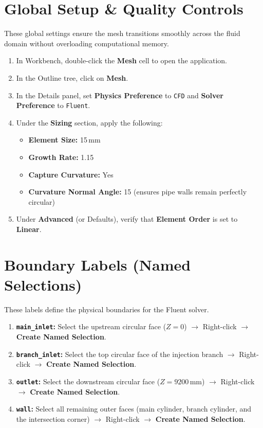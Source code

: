 \documentclass[12pt,a4paper]{report}
\begin{document}
\section{Global Setup \& Quality Controls}

These global settings ensure the mesh transitions smoothly across the fluid domain without overloading computational memory.

\begin{enumerate}
  \item In Workbench, double-click the \textbf{Mesh} cell to open the application.
  \item In the Outline tree, click on \textbf{Mesh}.
  \item In the Details panel, set \textbf{Physics Preference} to \texttt{CFD} and \textbf{Solver Preference} to \texttt{Fluent}.
  \item Under the \textbf{Sizing} section, apply the following:
  \begin{itemize}
    \item \textbf{Element Size:} 15\,mm
    \item \textbf{Growth Rate:} 1.15
    \item \textbf{Capture Curvature:} Yes
    \item \textbf{Curvature Normal Angle:} 15\textdegree{} (ensures pipe walls remain perfectly circular)
  \end{itemize}
  \item Under \textbf{Advanced} (or Defaults), verify that \textbf{Element Order} is set to \textbf{Linear}.
\end{enumerate}


\section{Boundary Labels (Named Selections)}

These labels define the physical boundaries for the Fluent solver.

\begin{enumerate}
  \item \textbf{\texttt{main\_inlet}:} Select the upstream circular face ($Z = 0$) $\rightarrow$ Right-click $\rightarrow$ \textbf{Create Named Selection}.
  \item \textbf{\texttt{branch\_inlet}:} Select the top circular face of the injection branch $\rightarrow$ Right-click $\rightarrow$ \textbf{Create Named Selection}.
  \item \textbf{\texttt{outlet}:} Select the downstream circular face ($Z = 9200$\,mm) $\rightarrow$ Right-click $\rightarrow$ \textbf{Create Named Selection}.
  \item \textbf{\texttt{wall}:} Select all remaining outer faces (main cylinder, branch cylinder, and the intersection corner) $\rightarrow$ Right-click $\rightarrow$ \textbf{Create Named Selection}.
\end{enumerate}
\end{document}
